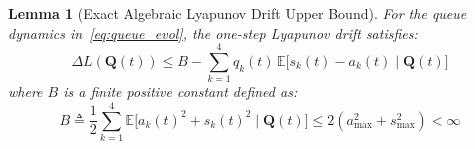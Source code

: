 \documentclass[conference]{IEEEtran}
\newtheorem{lemma}{Lemma}
\begin{document}
\begin{lemma}[Exact Algebraic Lyapunov Drift Upper Bound]
\label{lem:drift_bound}
For the queue dynamics in~\eqref{eq:queue_evol}, the one-step Lyapunov drift satisfies:
\begin{equation}
\label{eq:drift_bound}
\Delta L(\mathbf{Q}(t)) \le B - \sum_{k=1}^4 q_k(t) \, \mathbb{E}\Big[ s_k(t) - a_k(t) \;\Big|\; \mathbf{Q}(t) \Big]
\end{equation}
where $B$ is a finite positive constant defined as:
\begin{equation}
\label{eq:B_def}
B \triangleq \frac{1}{2} \sum_{k=1}^4 \mathbb{E}\Big[ a_k(t)^2 + s_k(t)^2 \;\Big|\; \mathbf{Q}(t) \Big] \le 2(a_{\max}^2 + s_{\max}^2) < \infty
\end{equation}
\end{lemma}
\end{document}
